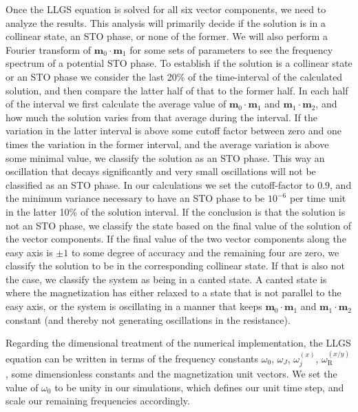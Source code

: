 Once the LLGS equation is solved for all six vector components, we need to analyze the results. This analysis will primarily decide if the solution is in a collinear state, an STO phase, or none of the former. We will also perform a Fourier transform of $\mathbold{m}_0\cdot\mathbold{m}_1$ for some sets of parameters to see the frequency spectrum of a potential STO phase. To establish if the solution is a collinear state or an STO phase we consider the last 20\% of the time-interval of the calculated solution, and then compare the latter half of that to the former half. In each half of the interval we first calculate the average value of $\mathbold{m}_0\cdot\mathbold{m}_1$ and $\mathbold{m}_1\cdot\mathbold{m}_2$, and how much the solution varies from that average during the interval. If the variation in the latter interval is above some cutoff factor between zero and one times the variation in the former interval, and the average variation is above some minimal value, we classify the solution as an STO phase. This way an oscillation that decays significantly and very small oscillations will not be classified as an STO phase. In our calculations we set the cutoff-factor to 0.9, and the minimum variance necessary to have an STO phase to be $10^{-6}$ per time unit in the latter 10\% of the solution interval. If the conclusion is that the solution is not an STO phase, we classify the state based on the final value of the solution of the vector components. If the final value of the two vector components along the easy axis is $\pm1$ to some degree of accuracy and the remaining four are zero, we classify the solution to be in the corresponding collinear state. If that is also not the case, we classify the system as being in a canted state. A canted state is where the magnetization has either relaxed to a state that is not parallel to the easy axis, or the system is oscillating in a manner that keeps $\mathbold{m}_0\cdot\mathbold{m}_1$ and $\mathbold{m}_1\cdot\mathbold{m}_2$ constant (and thereby not generating oscillations in the resistance). 

Regarding the dimensional treatment of the numerical implementation, the LLGS equation can be written in terms of the frequency constants $\omega_0$, $\omega_J$, $\omega_j^{(x)}$, $\omega_{\text{R}}^{(x/y)}$, some dimensionless constants and the magnetization unit vectors. We set the value of $\omega_0$ to be unity in our simulations, which defines our unit time step, and scale our remaining frequencies accordingly.

